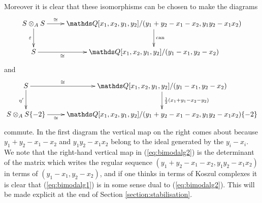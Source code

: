 \documentclass{compositio}
\theoremstyle{definition}
\numberwithin{equation}{section}
\def\can{\operatorname{can}}
\begin{document}
Moreover it is clear that these isomorphisms can be chosen to make the diagrams
\begin{equation}
\label{eq:bimodalg1}
\xymatrix{
S \otimes_A S \ar[d]_{\varepsilon} \ar[r]^-{\cong} & \QQ[x_1,x_2,y_1,y_2]/(y_1 + y_2 - x_1 - x_2, y_1 y_2 - x_1 x_2) \ar[d]^{\can}\\
S \ar[r]_-{\cong} & \QQ[x_1,x_2,y_1,y_2]/(y_1 - x_1, y_2 - x_2)
}
\end{equation}
and
\begin{equation}
\label{eq:bimodalg2}
\xymatrix{
S \ar[r]^-{\cong}\ar[d]_{\eta'} & \QQ[x_1,x_2,y_1,y_2]/(y_1 - x_1, y_2 - x_2) \ar[d]^{\frac{1}{2}(x_1 + y_1 - x_2 - y_2)}\\
S \otimes_A S\{-2\} \ar[r]_-{\cong} & \QQ[x_1,x_2,y_1,y_2]/(y_1 + y_2 - x_1 - x_2, y_1 y_2 - x_1 x_2)\{-2\}
}
\end{equation}
commute. In the first diagram the vertical map on the right comes about because $y_1 + y_2 - x_1 - x_2$ and $y_1 y_2 - x_1 x_2$ belong to the ideal generated by the $y_i - x_i$. We note that the right-hand vertical map in (\ref{eq:bimodalg2}) is the determinant of the matrix which writes the regular sequence $(y_1 + y_2 - x_1 - x_2, y_1 y_2 - x_1 x_2)$ in terms of $(y_1 - x_1, y_2 - x_2)$, and if one thinks in terms of Koszul complexes it is clear that (\ref{eq:bimodalg1}) is in some sense dual to (\ref{eq:bimodalg2}). This will be made explicit at the end of Section \ref{section:stabilisation}.
\end{document}

